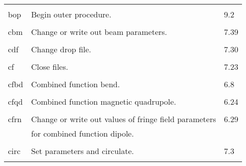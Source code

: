 \begin{center}
\begin{tabular}{lll}
\vspace{-3mm}& &\\
\hspace{1.5em}bop  &  Begin outer procedure.            &       \hspace{2em}9.2\\
\vspace{-3mm}& &\\
\hspace{1.5em}cbm  &  Change or write out beam parameters.    & \hspace{2em}7.39\\
\vspace{-3mm}& &\\
\hspace{1.5em}cdf   &   Change drop file.           & \hspace{2em}7.30\\
\vspace{-3mm}& &\\
\hspace{1.5em}cf    &   Close files.         & \hspace{2em}7.23\\
\vspace{-3mm}& &\\
\hspace{1.5em}cfbd    &   Combined function bend.         &  \hspace{2em}6.8 \\
\vspace{-3mm}& &\\
\hspace{1.5em}cfqd  &  Combined function magnetic quadrupole. & \hspace{2em}6.24\\
\vspace{-3mm}& &\\
\hspace{1.5em}cfrn  & Change or write out values of fringe field parameters &  \hspace{2em}6.29\\
               &  for combined function dipole.                    &      \\
\vspace{-3mm}& &\\
\hspace{1.5em}circ  &    Set parameters and circulate.        & \hspace{2em}7.3\\
\vspace{-3mm}& &\\
\end{tabular}


\end{center}

